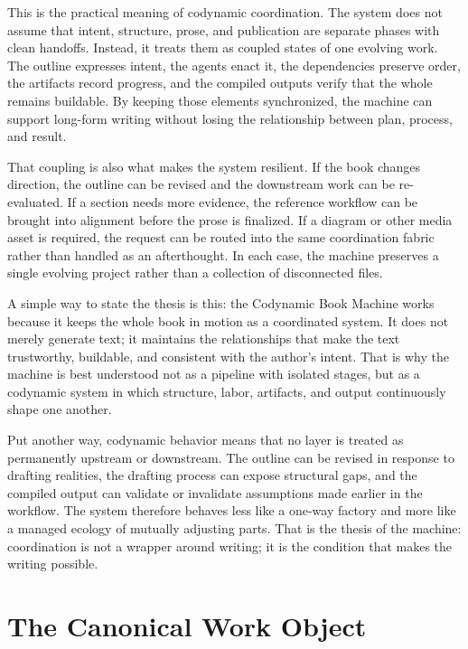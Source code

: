 \documentclass[11pt]{article}
\begin{document}
This is the practical meaning of codynamic coordination. The system does not assume that intent, structure, prose, and publication are separate phases with clean handoffs. Instead, it treats them as coupled states of one evolving work. The outline expresses intent, the agents enact it, the dependencies preserve order, the artifacts record progress, and the compiled outputs verify that the whole remains buildable. By keeping those elements synchronized, the machine can support long-form writing without losing the relationship between plan, process, and result.

That coupling is also what makes the system resilient. If the book changes direction, the outline can be revised and the downstream work can be re-evaluated. If a section needs more evidence, the reference workflow can be brought into alignment before the prose is finalized. If a diagram or other media asset is required, the request can be routed into the same coordination fabric rather than handled as an afterthought. In each case, the machine preserves a single evolving project rather than a collection of disconnected files.

A simple way to state the thesis is this: the Codynamic Book Machine works because it keeps the whole book in motion as a coordinated system. It does not merely generate text; it maintains the relationships that make the text trustworthy, buildable, and consistent with the author's intent. That is why the machine is best understood not as a pipeline with isolated stages, but as a codynamic system in which structure, labor, artifacts, and output continuously shape one another.

Put another way, codynamic behavior means that no layer is treated as permanently upstream or downstream. The outline can be revised in response to drafting realities, the drafting process can expose structural gaps, and the compiled output can validate or invalidate assumptions made earlier in the workflow. The system therefore behaves less like a one-way factory and more like a managed ecology of mutually adjusting parts. That is the thesis of the machine: coordination is not a wrapper around writing; it is the condition that makes the writing possible.



\section{The Canonical Work Object}
\end{document}
